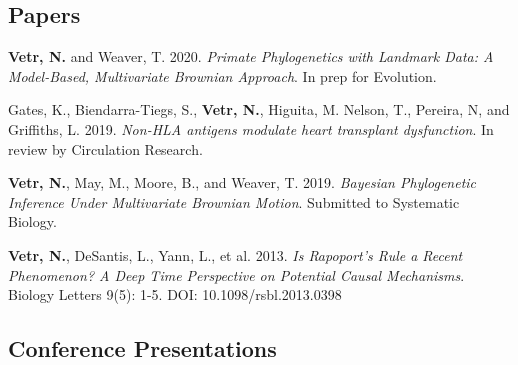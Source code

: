 \documentclass[12pt]{article}
\begin{document}
\subsection{Papers}

\begin{enumerate}[label={[\arabic*]}]

\item \textbf{Vetr, N.} and Weaver, T. 2020.  \emph{Primate Phylogenetics with Landmark Data: A Model-Based, Multivariate Brownian Approach}. In prep for Evolution.

\item Gates, K., Biendarra-Tiegs, S., \textbf{Vetr, N.}, Higuita, M. Nelson, T., Pereira, N, and Griffiths, L. 2019.  \emph{Non-HLA antigens modulate heart transplant dysfunction}. In review by Circulation Research.

\item \textbf{Vetr, N.}, May, M., Moore, B., and Weaver, T. 2019.  \emph{Bayesian Phylogenetic Inference Under Multivariate Brownian Motion}. Submitted to Systematic Biology.

\item \textbf{Vetr, N.}, DeSantis, L., Yann, L., et al. 2013.  \emph{Is Rapoport’s Rule a Recent Phenomenon? A Deep Time Perspective on Potential Causal Mechanisms}. Biology Letters 9(5): 1-5. DOI: 10.1098/rsbl.2013.0398


\end{enumerate}


\subsection{Conference Presentations}
\end{document}
